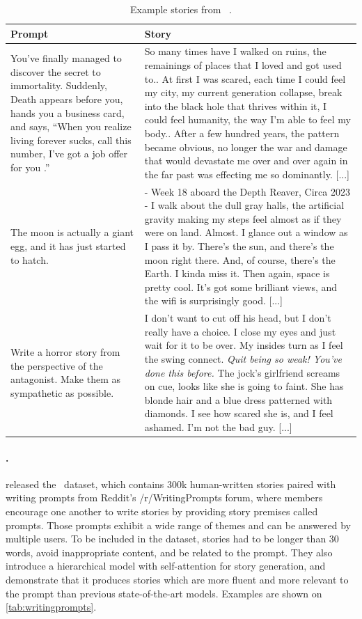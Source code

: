 \begin{table}[h!]
\small
\centering
\begin{tabular}{p{}p{}}
\toprule
    \textbf{Prompt} & \textbf{Story} \\
\midrule
    You've finally managed to discover the secret to immortality. Suddenly, Death appears before you, hands you a business card, and says, ``When you realize living forever sucks, call this number, I've got a job offer for you .'' & So many times have I walked on ruins, the remainings of places that I loved and got used to.. At first I was scared, each time I could feel my city, my current generation collapse, break into the black hole that thrives within it, I could feel humanity, the way I'm able to feel my body.. After a few hundred years, the pattern became obvious, no longer the war and damage that would devastate me over and over again in the far past was effecting me so dominantly. [...] \\
\midrule
    The moon is actually a giant egg, and it has just started to hatch. & - Week 18 aboard the Depth Reaver, Circa 2023 - I walk about the dull gray halls, the artificial gravity making my steps feel almost as if they were on land. Almost. I glance out a window as I pass it by. There's the sun, and there's the moon right there. And, of course, there's the Earth. I kinda miss it. Then again, space is pretty cool. It's got some brilliant views, and the wifi is surprisingly good. [...] \\
\midrule
    Write a horror story from the perspective of the antagonist. Make them as sympathetic as possible. & I don't want to cut off his head, but I don't really have a choice. I close my eyes and just wait for it to be over. My insides turn as I feel the swing connect. \textit{Quit being so weak! You've done this before.} The jock's girlfriend screams on cue, looks like she is going to faint. She has blonde hair and a blue dress patterned with diamonds. I see how scared she is, and I feel ashamed. I'm not the bad guy. [...] \\
\bottomrule
\end{tabular}
\caption{Example stories from \wpfan\ \citep{fan2018hierarchical}.}
\label{tab:writingprompts}
\end{table}

\paragraph{\wpfan.}
\citet{fan2018hierarchical} released the \wpfan\ dataset, which contains 300k human-written stories paired with writing prompts from Reddit's /r/WritingPrompts forum, where members encourage one another to write stories by providing story premises called prompts. Those prompts exhibit a wide range of themes and can be answered by multiple users. To be included in the dataset, stories had to be longer than 30 words, avoid inappropriate content, and be related to the prompt. They also introduce a hierarchical model with self-attention for story generation, and demonstrate that it produces stories which are more fluent and more relevant to the prompt than previous state-of-the-art models. Examples are shown on \autoref{tab:writingprompts}.


